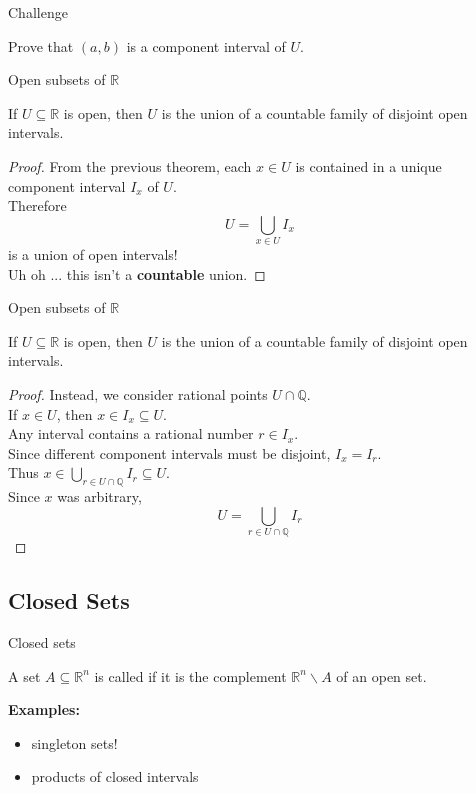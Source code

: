 \documentclass{beamer}
\begin{document}
\begin{frame}{Challenge}
\begin{prob}
Prove that $(a,b)$ is a component interval of $U$.
\end{prob}
\end{frame}

\begin{frame}{Open subsets of $\mathbb{R}$}
\begin{thm}
If $U\subseteq\mathbb{R}$ is open, then $U$ is the union of a countable family of disjoint open intervals.
\end{thm}
\pause
\begin{proof}
From the previous theorem, each $x\in U$ is contained in a unique component interval $I_x$ of $U$.\\
\pause
Therefore
$$U = \bigcup_{x\in U} I_x$$
is a union of open intervals!\\
\pause
{\color{red}Uh oh ... this isn't a \textbf{countable} union.}
\end{proof}
\end{frame}

\begin{frame}{Open subsets of $\mathbb{R}$}
\begin{thm}
If $U\subseteq\mathbb{R}$ is open, then $U$ is the union of a countable family of disjoint open intervals.
\end{thm}
\begin{proof}
Instead, we consider rational points $U\cap\mathbb{Q}$.\\
\pause
If $x\in U$, then $x\in I_x\subseteq U$.\\
\pause
Any interval contains a rational number $r\in I_x$.\\
\pause
Since different component intervals must be disjoint, $I_x=I_r$.\\
\pause
Thus $x\in \bigcup_{r\in U\cap\mathbb{Q}} I_r\subseteq U$.\\
\pause
Since $x$ was arbitrary, 
$$U= \bigcup_{r\in U\cap\mathbb{Q}} I_r$$
\end{proof}
\end{frame}

\subsection{Closed Sets}

\begin{frame}{Closed sets}
\begin{defn}
A set $A\subseteq\mathbb{R}^n$ is called  if it is the complement $\mathbb{R}^n\backslash A$ of an open set.
\end{defn}
\textbf{Examples:}
\begin{itemize}
\item singleton sets!
\item products of closed intervals
\end{itemize}
\end{frame}
\end{document}
